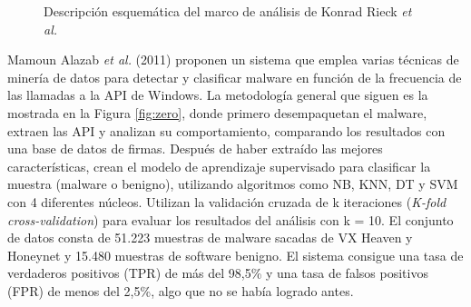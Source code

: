 \begin{figure}[h!]
\begin{center}
{}
\end{center}
\caption{Descripción esquemática del marco de análisis de Konrad Rieck \textit{et al.}}
\label{fig:automatic}
\end{figure}

\newpage

Mamoun Alazab \textit{et al.} (2011) \cite{zero} proponen un sistema que emplea varias técnicas de minería de datos para detectar y clasificar malware en función de la frecuencia de las llamadas a la \gls{API} de Windows. La metodología general que siguen es la mostrada en la Figura \ref{fig:zero}, donde primero desempaquetan el malware, extraen las \gls{API} y analizan su comportamiento, comparando los resultados con una base de datos de firmas. Después de haber extraído las mejores características, crean el modelo de aprendizaje supervisado para clasificar la muestra (malware o benigno), utilizando algoritmos como \gls{NB}, \gls{KNN}, \gls{DT} y \gls{SVM} con 4 diferentes núcleos. Utilizan la validación cruzada de k iteraciones (\textit{K-fold cross-validation}) para evaluar los resultados del análisis con k = 10. El conjunto de datos consta de 51.223 muestras de malware sacadas de VX Heaven y Honeynet y 15.480 muestras de software benigno. El sistema consigue una tasa de verdaderos positivos (\gls{TPR}) de más del 98,5\% y una tasa de falsos positivos (\gls{FPR}) de menos del 2,5\%, algo que no se había logrado antes.

